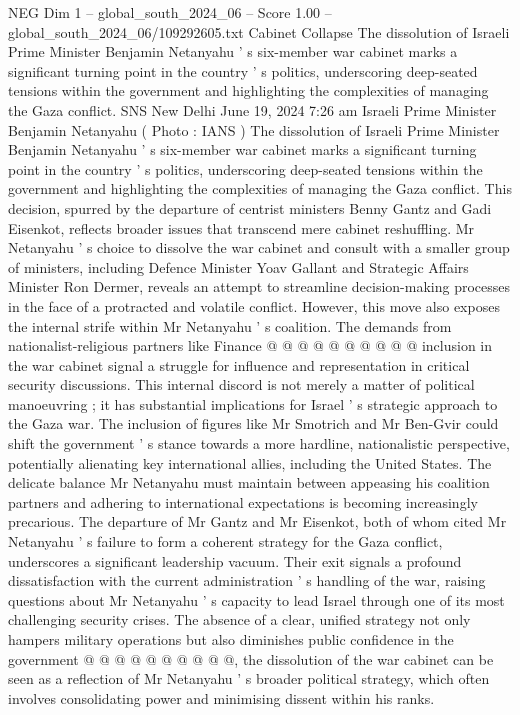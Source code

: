 \begin{textsample}{NEG Dim 1 – global\_south\_2024\_06 – Score 1.00 – global\_south\_2024\_06/109292605.txt}  \label{ex:f1_neg_403}
Cabinet Collapse The dissolution of Israeli Prime Minister Benjamin Netanyahu ' s six-member war cabinet marks a significant turning point in the country ' s politics, underscoring deep-seated tensions within the government and highlighting the complexities of managing the Gaza conflict.
SNS New Delhi June 19, 2024 7:26 am Israeli Prime Minister Benjamin Netanyahu ( Photo : IANS ) The dissolution of Israeli Prime Minister Benjamin Netanyahu ' s six-member war cabinet marks a significant turning point in the country ' s politics, underscoring deep-seated tensions within the government and highlighting the complexities of managing the Gaza conflict.
This decision, spurred by the departure of centrist ministers Benny Gantz and Gadi Eisenkot, reflects broader issues that transcend mere cabinet reshuffling.
Mr Netanyahu ' s choice to dissolve the war cabinet and consult with a smaller group of ministers, including Defence Minister Yoav Gallant and Strategic Affairs Minister Ron Dermer, reveals an attempt to streamline decision-making processes in the face of a protracted and volatile conflict.
However, this move also exposes the internal strife within Mr Netanyahu ' s coalition.
The demands from nationalist-religious partners like Finance @ @ @ @ @ @ @ @ @ @ inclusion in the war cabinet signal a struggle for influence and representation in critical security discussions.
This internal discord is not merely a matter of political manoeuvring ; it has substantial implications for Israel ' s strategic approach to the Gaza war.
The inclusion of figures like Mr Smotrich and Mr Ben-Gvir could shift the government ' s stance towards a more hardline, nationalistic perspective, potentially alienating key international allies, including the United States.
The delicate balance Mr Netanyahu must maintain between appeasing his coalition partners and adhering to international expectations is becoming increasingly precarious.
The departure of Mr Gantz and Mr Eisenkot, both of whom cited Mr Netanyahu ' s failure to form a coherent strategy for the Gaza conflict, underscores a significant leadership vacuum.
Their exit signals a profound dissatisfaction with the current administration ' s handling of the war, raising questions about Mr Netanyahu ' s capacity to lead Israel through one of its most challenging security crises.
The absence of a clear, unified strategy not only hampers military operations but also diminishes public confidence in the government @ @ @ @ @ @ @ @ @ @, the dissolution of the war cabinet can be seen as a reflection of Mr Netanyahu ' s broader political strategy, which often involves consolidating power and minimising dissent within his ranks.

\end{textsample}
